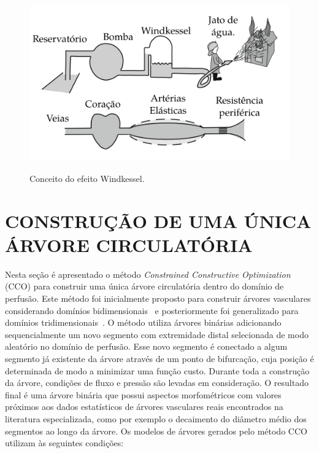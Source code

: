 \begin{figure}[!htb]
  \centering
  \captiondelim{: }
  \caption{Conceito do efeito Windkessel.} 
  \includegraphics[scale=0.4]{figuras/revisao-sistema-circulatorio/efeito-windkessel.png}
  \label{fig:efeito-windkessel}
\end{figure}

\section{CONSTRUÇÃO DE UMA ÚNICA ÁRVORE CIRCULATÓRIA}\label{sec:cco}

Nesta seção é apresentado o método \textit{Constrained Constructive Optimization} (CCO) para 
construir uma única árvore circulatória dentro do domínio de perfusão. Este método foi inicialmente 
proposto para construir árvores vasculares 
considerando domínios bidimensionais~\cite{Schreiner1993b} e posteriormente foi
generalizado para domínios tridimensionais~\cite{Karch1999}. O método utiliza
árvores binárias adicionando sequencialmente um novo segmento com extremidade 
distal selecionada de modo aleatório no domínio de perfusão. Esse novo segmento 
é conectado a algum segmento já existente da árvore através de um ponto
de bifurcação, cuja posição é determinada de modo a minimizar uma função custo.
Durante toda a construção da árvore, condições de fluxo e pressão são levadas 
em consideração. O resultado final é uma árvore binária que possui aspectos 
morfométricos com valores próximos aos dados estatísticos de árvores vasculares 
reais encontrados na literatura especializada, 
como por exemplo o decaimento do diâmetro médio dos segmentos ao longo da árvore.
Os modelos de árvores gerados pelo método CCO utilizam às seguintes condições:

